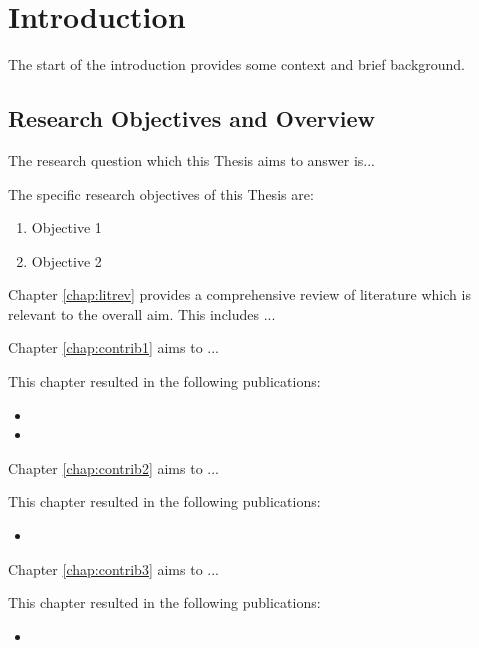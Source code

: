 \chapter{Introduction}\label{chap:intro}

The start of the introduction provides some context and brief background.

\section{Research Objectives and Overview}


The research question which this Thesis aims to answer is...


The specific research objectives of this Thesis are:

\begin{enumerate}
\item Objective 1
\item Objective 2
\end{enumerate}

Chapter \ref{chap:litrev} provides a comprehensive review of literature which is relevant to the overall aim. This includes ...

Chapter \ref{chap:contrib1} aims to ...

This chapter resulted in the following publications:

\begin{itemize}
\item {}
\item {}
\end{itemize}

Chapter \ref{chap:contrib2} aims to ...

This chapter resulted in the following publications:

\begin{itemize}
\item {}
\end{itemize}

Chapter \ref{chap:contrib3} aims to ...

This chapter resulted in the following publications:

\begin{itemize}
\item {}
\end{itemize}

